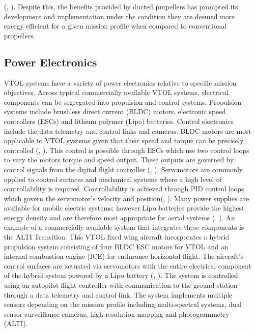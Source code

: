 (\citeauthor{RyuMinhyoung2016AAot}, \citeyear{RyuMinhyoung2016AAot}). Despite this, the benefits provided by ducted propellers has prompted its development and implementation under the condition they are deemed more energy efficient for a given mission profile when compared to conventional propellers.
 
\subsection{Power Electronics}

VTOL systems have a variety of power electronics relative to specific mission objectives. Across typical commercially available VTOL systems, electrical components can be segregated into propulsion and control systems. Propulsion systems include brushless direct current (BLDC) motors, electronic speed controllers (ESCs) and lithium polymer (Lipo) batteries. Control electronics include the data telemetry and control links and cameras. BLDC motors are most applicable to VTOL systems given that their speed and torque can be precisely controlled (\citeauthor{singh1997recent}, \citeyear{singh1997recent}). This control is possible through ESCs which use two control loops to vary the motors torque and speed output. These outputs are governed by control signals from the digital flight controller (\citeauthor{kandiban2012design}, \citeyear{kandiban2012design}). Servomotors are commonly applied to control surfaces and mechanical systems where a high level of controllability is required. Controllability is achieved through PID control loops which govern the servomotor's velocity and position(\citeauthor{huang2009precision}, \citeyear{huang2009precision}). Many power supplies are available for mobile electric systems; however Lipo batteries provide the highest energy density and are therefore most appropriate for aerial systems (\citeauthor{epectec}, \citeyear{epectec}). An example of a commercially available system that integrates these components is the ALTI Transition. This VTOL fixed wing aircraft incorporates a hybrid propulsion system consisting of four BLDC ESC motors for VTOL and an internal combustion engine (ICE) for endurance horizontal flight. The aircraft's control surfaces are actuated via servomotors with the entire electrical component of the hybrid system powered by a Lipo battery (\citeauthor{vitech}, \citeyear{vitech}). The system is controlled using an autopilot flight controller with communication to the ground station through a data telemetry and control link. The system implements multiple sensors depending on the mission profile including multi-spectral systems, dual sensor surveillance cameras, high resolution mapping and photogrammetry (ALTI). 

